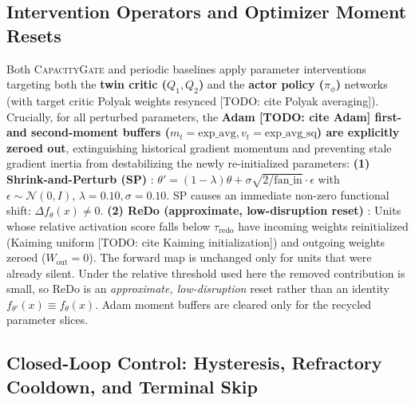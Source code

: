 \documentclass{article}
\begin{document}
\subsection{Intervention Operators and Optimizer Moment Resets}
\label{sec:operators}

Both \textsc{CapacityGate} and periodic baselines apply parameter interventions targeting both the \textbf{twin critic ($Q_1, Q_2$)} and the \textbf{actor policy ($\pi_\phi$)} networks (with target critic Polyak weights resynced [TODO: cite Polyak averaging]). Crucially, for all perturbed parameters, the \textbf{Adam [TODO: cite Adam] first- and second-moment buffers ($m_t = \mathrm{exp\_avg}, v_t = \mathrm{exp\_avg\_sq}$) are explicitly zeroed out}, extinguishing historical gradient momentum and preventing stale gradient inertia from destabilizing the newly re-initialized parameters:
\textbf{(1) Shrink-and-Perturb (SP)} \citep{ash2020warmstarting, nikishin2022primacy}: $\theta' = (1 - \lambda)\theta + \sigma \sqrt{2/\mathrm{fan\_in}} \cdot \epsilon$ with $\epsilon \sim \mathcal{N}(0, I)$, $\lambda = 0.10, \sigma = 0.10$. SP causes an immediate non-zero functional shift: $\Delta f_\theta(x) \neq 0$.
\textbf{(2) ReDo (approximate, low-disruption reset)} \citep{sokar2023dormant}: Units whose relative activation score falls below $\tau_{\mathrm{redo}}$ have incoming weights reinitialized (Kaiming uniform [TODO: cite Kaiming initialization]) and outgoing weights zeroed ($W_{\mathrm{out}} = 0$). The forward map is unchanged only for units that were already silent. Under the relative threshold used here the removed contribution is small, so ReDo is an \emph{approximate, low-disruption} reset rather than an identity $f_{\theta'}(x) \equiv f_\theta(x)$. Adam moment buffers are cleared only for the recycled parameter slices.

\subsection{Closed-Loop Control: Hysteresis, Refractory Cooldown, and Terminal Skip}
\label{sec:controller}
\end{document}
